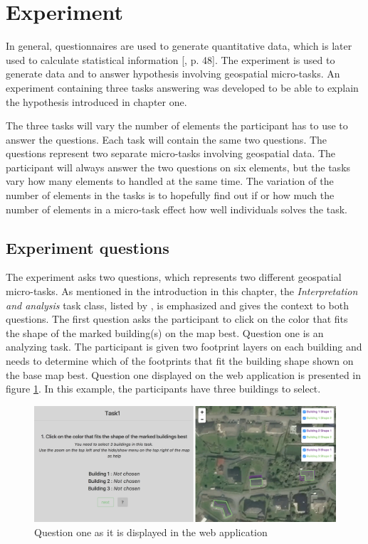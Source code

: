 \section{Experiment}\label{sec:experiment}
In general, questionnaires are used to generate quantitative data, which is later used to calculate statistical information [\citep{Kitchin2000}, p. 48]. The experiment is used to generate data and to answer hypothesis involving geospatial micro-tasks. An experiment containing three tasks answering was developed to be able to explain the hypothesis introduced in chapter one. 

The three tasks will vary the number of elements the participant has to use to answer the questions. Each task will contain the same two questions. The questions represent two separate micro-tasks involving geospatial data. The participant will always answer the two questions on six elements, but the tasks vary how many elements to handled at the same time. The variation of the number of elements in the tasks is to hopefully find out if or how much the number of elements in a micro-task effect how well individuals solves the task. 

\subsection{Experiment questions}\label{sec:experimentquestions}
The experiment asks two questions, which represents two different geospatial micro-tasks. As mentioned in the introduction in this chapter, the \textit{Interpretation and analysis} task class, listed by \cite{Gadiraju2015}, is emphasized and gives the context to both questions.  The first question asks the participant to click on the color that fits the shape of the marked building(s) on the map best. Question one is an analyzing task. The participant is given two footprint layers on each building and needs to determine which of the footprints that fit the building shape shown on the base map best. Question one displayed on the web application is presented in figure \ref{fig:q12}. In this example, the participants have three buildings to select. 

\begin{figure}[h]
	\centering
	\includegraphics[width=0.8\linewidth]{fig/q1_2}
	\caption{Question one as it is displayed in the web application}
	\label{fig:q12}
\end{figure}

